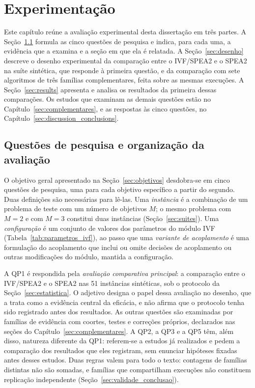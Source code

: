 \chapter{Experimentação}
\label{sec:Experiments}

Este capítulo reúne a avaliação experimental desta dissertação em três partes. A Seção~\ref{sec:questoes} formula as cinco questões de pesquisa e indica, para cada uma, a evidência que a examina e a seção em que ela é relatada. A Seção~\ref{sec:desenho} descreve o desenho experimental da comparação entre o IVF/SPEA2 e o SPEA2 na suíte sintética, que responde à primeira questão, e da comparação com sete algoritmos de três famílias complementares, feita sobre as mesmas execuções. A Seção~\ref{sec:results} apresenta e analisa os resultados da primeira dessas comparações. Os estudos que examinam as demais questões estão no Capítulo~\ref{sec:complementares}, e as respostas às cinco questões, no Capítulo~\ref{sec:discussion_conclusions}.

\section{Questões de pesquisa e organização da avaliação}
\label{sec:questoes}

O objetivo geral apresentado na Seção~\ref{sec:objetivos} desdobra-se em cinco questões de pesquisa, uma para cada objetivo específico a partir do segundo. Duas definições são necessárias para lê-las. Uma \emph{instância} é a combinação de um problema de teste com um número de objetivos $M$; o mesmo problema com $M = 2$ e com $M = 3$ constitui duas instâncias (Seção~\ref{sec:suites}). Uma \emph{configuração} é um conjunto de valores dos parâmetros do módulo IVF (Tabela~\ref{tab:parametros_ivf}), ao passo que uma \emph{variante de acoplamento} é uma formulação do acoplamento que inclui ou omite decisões de acoplamento ou outras modificações do módulo, mantida a configuração.

A QP1 é respondida pela \emph{avaliação comparativa principal}: a comparação entre o IVF/SPEA2 e o SPEA2 nas 51 instâncias sintéticas, sob o protocolo da Seção~\ref{sec:estatistica}. O adjetivo designa o papel dessa avaliação no desenho, que a trata como a evidência central da eficácia, e não afirma que o protocolo tenha sido registrado antes dos resultados. As outras questões são examinadas por famílias de evidência com coortes, testes e correções próprios, declarados nas seções do Capítulo~\ref{sec:complementares}. A QP2, a QP3 e a QP5 têm, além disso, natureza diferente da QP1: referem-se a estudos já realizados e pedem a comparação dos resultados que eles registram, sem enunciar hipóteses fixadas antes desses estudos. Duas regras valem para todo o texto: contagens de famílias distintas não são somadas, e famílias que compartilham execuções não constituem replicação independente (Seção~\ref{sec:validade_conclusao}).

